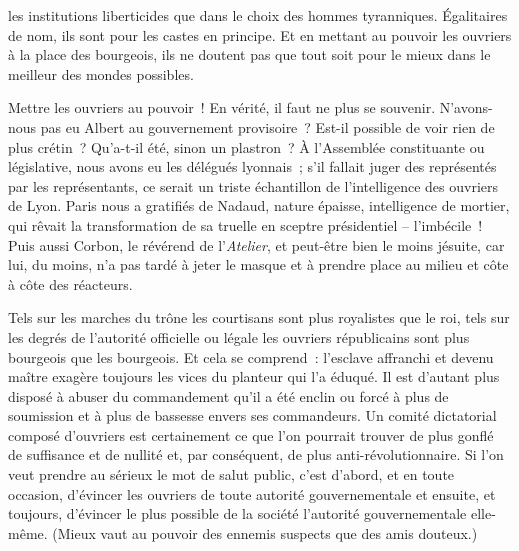 \documentclass[french,twoside]{book} %
\begin{document}
les institutions liberticides que dans le choix des hommes tyranniques. Égalitaires de nom, ils sont pour les castes en principe. Et en mettant au pouvoir les ouvriers à la place des bourgeois, ils ne doutent pas que tout soit pour le mieux dans le meilleur des mondes possibles.\par
Mettre les ouvriers au pouvoir ! En vérité, il faut ne plus se souvenir. N’avons-nous pas eu Albert au gouvernement provisoire ? Est-il possible de voir rien de plus crétin ? Qu’a-t-il été, sinon un plastron ? À l’Assemblée constituante ou législative, nous avons eu les délégués lyonnais ; s’il fallait juger des représentés par les représentants, ce serait un triste échantillon de l’intelligence des ouvriers de Lyon. Paris nous a gratifiés de Nadaud, nature épaisse, intelligence de mortier, qui rêvait la transformation de sa truelle en sceptre présidentiel – l’imbécile ! Puis aussi Corbon, le révérend de l’\emph{Atelier}, et peut-être bien le moins jésuite, car lui, du moins, n’a pas tardé à jeter le masque et à prendre place au milieu et côte à côte des réacteurs.\par
Tels sur les marches du trône les courtisans sont plus royalistes que le roi, tels sur les degrés de l’autorité officielle ou légale les ouvriers républicains sont plus bourgeois que les bourgeois. Et cela se comprend : l’esclave affranchi et devenu maître exagère toujours les vices du planteur qui l’a éduqué. Il est d’autant plus disposé à abuser du commandement qu’il a été enclin ou forcé à plus de soumission et à plus de bassesse envers ses commandeurs. Un comité dictatorial composé d’ouvriers est certainement ce que l’on pourrait trouver de plus gonflé de suffisance et de nullité et, par conséquent, de plus anti-révolutionnaire. Si l’on veut prendre au sérieux le mot de salut public, c’est d’abord, et en toute occasion, d’évincer les ouvriers de toute autorité gouvernementale et ensuite, et toujours, d’évincer le plus possible de la société l’autorité gouvernementale elle-même. (Mieux vaut au pouvoir des ennemis suspects que des amis douteux.)\par
\end{document}

